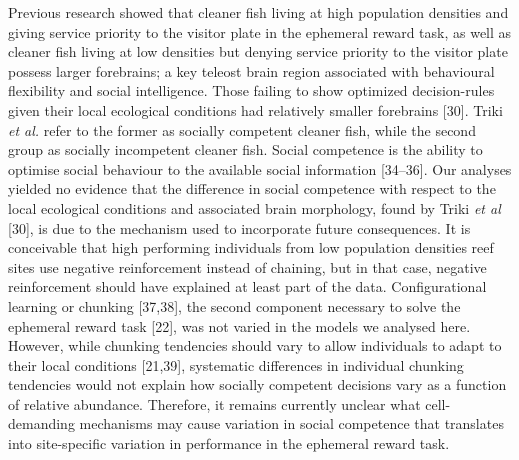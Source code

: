 \documentclass[10pt,letterpaper]{article}
\begin{document}
Previous research showed that cleaner fish living at high population
densities and giving service priority to the visitor plate in the
ephemeral reward task, as well as cleaner fish living at low densities
but denying service priority to the visitor plate possess larger
forebrains; a key teleost brain region associated with behavioural
flexibility and social intelligence. Those failing to show optimized
decision-rules given their local ecological conditions had relatively
smaller forebrains {[}30{]}. Triki \emph{et al.} refer to the former as
socially competent cleaner fish, while the second group as socially
incompetent cleaner fish. Social competence is the ability to optimise
social behaviour to the available social information {[}34--36{]}. Our
analyses yielded no evidence that the difference in social competence
with respect to the local ecological conditions and associated brain
morphology, found by Triki \emph{et al} {[}30{]}, is due to the
mechanism used to incorporate future consequences. It is conceivable
that high performing individuals from low population densities reef
sites use negative reinforcement instead of chaining, but in that case,
negative reinforcement should have explained at least part of the data.
Configurational learning or chunking {[}37,38{]}, the second component
necessary to solve the ephemeral reward task {[}22{]}, was not varied in
the models we analysed here. However, while chunking tendencies should
vary to allow individuals to adapt to their local conditions
{[}21,39{]}, systematic differences in individual chunking tendencies
would not explain how socially competent decisions vary as a function of
relative abundance. Therefore, it remains currently unclear what
cell-demanding mechanisms may cause variation in social competence that
translates into site-specific variation in performance in the ephemeral
reward task.
\end{document}
